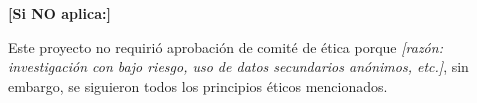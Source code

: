 \textbf{[Si NO aplica:]}

Este proyecto no requirió aprobación de comité de ética porque \textit{[razón: investigación con bajo riesgo, uso de datos secundarios anónimos, etc.]}, sin embargo, se siguieron todos los principios éticos mencionados.

%
%

